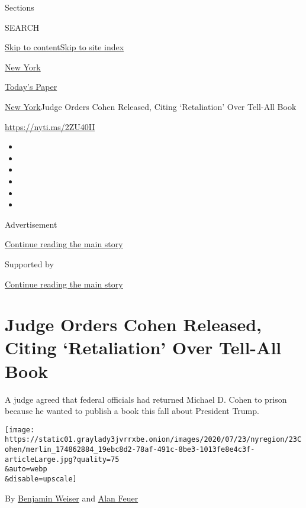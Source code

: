 Sections

SEARCH

\protect\hyperlink{site-content}{Skip to
content}\protect\hyperlink{site-index}{Skip to site index}

\href{https://www.nytimes3xbfgragh.onion/section/nyregion}{New York}

\href{https://myaccount.nytimes3xbfgragh.onion/auth/login?response_type=cookie\&client_id=vi}{}

\href{https://www.nytimes3xbfgragh.onion/section/todayspaper}{Today's
Paper}

\href{/section/nyregion}{New York}\textbar{}Judge Orders Cohen Released,
Citing `Retaliation' Over Tell-All Book

\url{https://nyti.ms/2ZU40II}

\begin{itemize}
\item
\item
\item
\item
\item
\item
\end{itemize}

Advertisement

\protect\hyperlink{after-top}{Continue reading the main story}

Supported by

\protect\hyperlink{after-sponsor}{Continue reading the main story}

\hypertarget{judge-orders-cohen-released-citing-retaliation-over-tell-all-book}{%
\section{Judge Orders Cohen Released, Citing `Retaliation' Over Tell-All
Book}\label{judge-orders-cohen-released-citing-retaliation-over-tell-all-book}}

A judge agreed that federal officials had returned Michael D. Cohen to
prison because he wanted to publish a book this fall about President
Trump.

\texttt{[image: https://static01.graylady3jvrrxbe.onion/images/2020/07/23/nyregion/23Cohen/merlin\_174862884\_19ebc8d2-78af-491c-8be3-1013fe8e4c3f-articleLarge.jpg?quality=75\\\&auto=webp\\\&disable=upscale]}

By \href{https://www.nytimes3xbfgragh.onion/by/benjamin-weiser}{Benjamin
Weiser} and \href{https://www.nytimes3xbfgragh.onion/by/alan-feuer}{Alan
Feuer}


